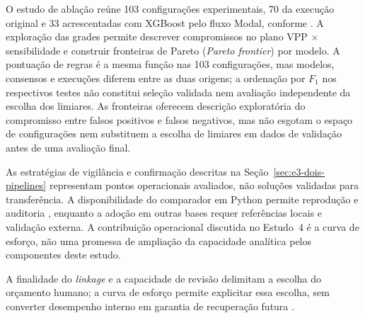 O estudo de ablação reúne 103 configurações experimentais, 70 da execução original e 33 acrescentadas com XGBoost pelo fluxo Modal, conforme . A exploração das grades permite descrever compromissos no plano VPP $\times$ sensibilidade e construir fronteiras de Pareto (\textit{Pareto frontier}) por modelo. A pontuação de regras é a mesma função nas 103 configurações, mas modelos, consensos e execuções diferem entre as duas origens; a ordenação por $F_1$ nos respectivos testes não constitui seleção validada nem avaliação independente da escolha dos limiares. As fronteiras oferecem descrição exploratória do compromisso entre falsos positivos e falsos negativos, mas não esgotam o espaço de configurações nem substituem a escolha de limiares em dados de validação antes de uma avaliação final.

As estratégias de vigilância e confirmação descritas na Seção~\ref{sec:e3-dois-pipelines} representam pontos operacionais avaliados, não soluções validadas para transferência. A disponibilidade do comparador em Python permite reprodução e auditoria \cite{Jardim2025comparador}, enquanto a adoção em outras bases requer referências locais e validação externa. A contribuição operacional discutida no Estudo~4 é a curva de esforço, não uma promessa de ampliação da capacidade analítica pelos componentes deste estudo.

A finalidade do \textit{linkage} e a capacidade de revisão delimitam a escolha do orçamento humano; a curva de esforço permite explicitar essa escolha, sem converter desempenho interno em garantia de recuperação futura \cite{Jardim2026phdrepo}.

